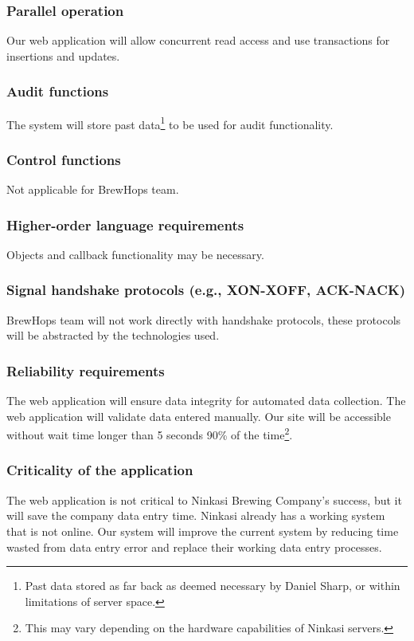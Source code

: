 \documentclass[draftclsnofoot,onecolumn,letterpaper,10pt,compsoc]{IEEEtran}
\begin{document}
		\subsubsection{Parallel operation}
        Our web application will allow concurrent read access and use transactions for insertions and updates.

		\subsubsection{Audit functions}
        The system will store past data\footnote{Past data stored as far back as deemed necessary by Daniel Sharp, or within limitations of server space.} to be used for audit functionality.

		\subsubsection{Control functions}
        Not applicable for BrewHops team.

		\subsubsection{Higher-order language requirements}
        Objects and callback functionality may be necessary.

		\subsubsection{Signal handshake protocols (e.g., XON-XOFF, ACK-NACK)}
        BrewHops team will not work directly with handshake protocols, these protocols will be abstracted by the technologies used.

		\subsubsection{Reliability requirements}
		The web application will ensure data integrity for automated data collection.
		The web application will validate data entered manually.
		Our site will be accessible without wait time longer than 5 seconds 90\% of the time\footnote{This may vary depending on the hardware capabilities of Ninkasi servers.}.

		\subsubsection{Criticality of the application}
		The web application is not critical to Ninkasi Brewing Company’s success, but it will save the company data entry time.
		Ninkasi already has a working system that is not online.
		Our system will improve the current system by reducing time wasted from data entry error and replace their working data entry processes.
\end{document}
